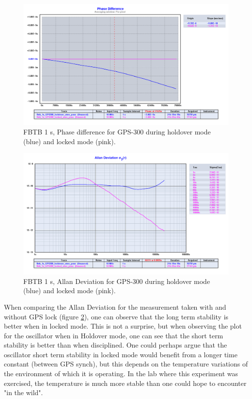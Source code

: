 \documentclass[11pt,english,a4paper]{article}
\begin{document}
\begin{figure}[!htb]
  \centering
    \includegraphics[width=1\textwidth]{del_2_spm1_phase_diff.png}
      \caption{FBTB 1 s, Phase difference for GPS-300 during holdover mode (blue) and locked mode (pink).}
          \label{fig:del_2_spm1_phase_diff}
\end{figure}

\begin{figure}[!htb]
  \centering
    \includegraphics[width=1\textwidth]{del_2_spm1_allan_dev.png}
      \caption{FBTB 1 s, Allan Deviation for GPS-300 during holdover mode (blue) and locked mode (pink).}
          \label{fig:del_2_spm1_allan_dev}
\end{figure}
When comparing the Allan Deviation for the measurement taken with and without GPS lock (figure \ref{fig:del_2_spm1_allan_dev}), one can observe that the long term stability is better when in locked mode. This is not a surprise, but when observing the plot for the oscillator when in Holdover mode, one can see that the short term stability is better than when disciplined. One could perhaps argue that the oscillator short term stability in locked mode would benefit from a longer time constant (between GPS synch), but this depends on the temperature variations of the environment of which it is operating. In the lab where this experiment was exercised, the temperature is much more stable than one could hope to encounter "in the wild".
\end{document}
